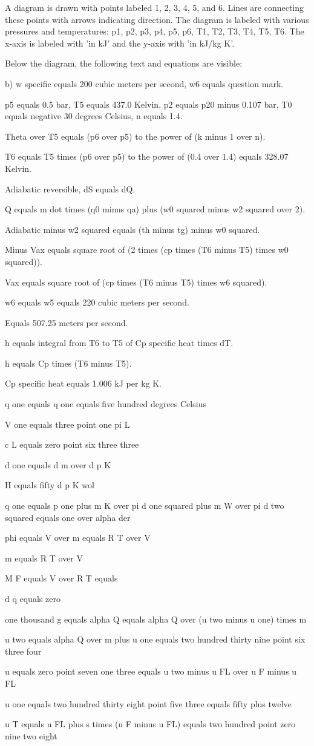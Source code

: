 A diagram is drawn with points labeled 1, 2, 3, 4, 5, and 6. Lines are connecting these points with arrows indicating direction. The diagram is labeled with various pressures and temperatures: p1, p2, p3, p4, p5, p6, T1, T2, T3, T4, T5, T6. The x-axis is labeled with 'in kJ' and the y-axis with 'in kJ/kg K'.

Below the diagram, the following text and equations are visible:

b) w specific equals 200 cubic meters per second, w6 equals question mark.

p5 equals 0.5 bar, T5 equals 437.0 Kelvin, p2 equals p20 minus 0.107 bar, T0 equals negative 30 degrees Celsius, n equals 1.4.

Theta over T5 equals (p6 over p5) to the power of (k minus 1 over n).

T6 equals T5 times (p6 over p5) to the power of (0.4 over 1.4) equals 328.07 Kelvin.

Adiabatic reversible, dS equals dQ.

Q equals m dot times (q0 minus qa) plus (w0 squared minus w2 squared over 2).

Adiabatic minus w2 squared equals (th minus tg) minus w0 squared.

Minus Vax equals square root of (2 times (cp times (T6 minus T5) times w0 squared)).

Vax equals square root of (cp times (T6 minus T5) times w6 squared).

w6 equals w5 equals 220 cubic meters per second.

Equals 507.25 meters per second.

h equals integral from T6 to T5 of Cp specific heat times dT.

h equals Cp times (T6 minus T5).

Cp specific heat equals 1.006 kJ per kg K.

q one equals q one equals five hundred degrees Celsius

V one equals three point one pi L

c L equals zero point six three three

d one equals d m over d p K

H equals fifty d p K wol

q one equals p one plus m K over pi d one squared plus m W over pi d two squared equals one over alpha der

phi equals V over m equals R T over V

m equals R T over V

M F equals V over R T equals

d q equals zero

one thousand g equals alpha Q equals alpha Q over (u two minus u one) times m

u two equals alpha Q over m plus u one equals two hundred thirty nine point six three four

u equals zero point seven one three equals u two minus u FL over u F minus u FL

u one equals two hundred thirty eight point five three equals fifty plus twelve

u T equals u FL plus s times (u F minus u FL) equals two hundred point zero nine two eight